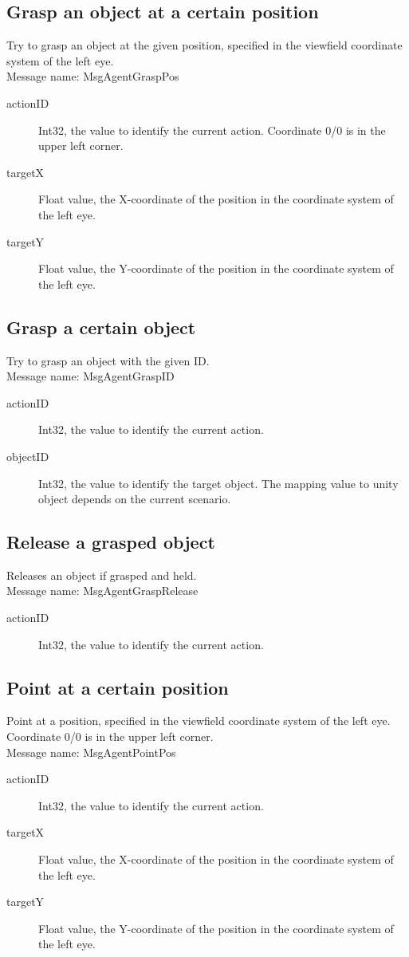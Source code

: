 \documentclass[a4paper,10pt]{scrartcl}
\begin{document}
\subsection{Grasp an object at a certain position}
Try to grasp an object at the given position, specified in the viewfield coordinate system of the left eye.\\
Message name: MsgAgentGraspPos 
\begin{description}
 \item [actionID] Int32, the value to identify the current action. Coordinate 0/0 is in the upper left corner.
 \item [targetX] Float value, the X-coordinate of the position in the coordinate system of the left eye.
 \item [targetY] Float value, the Y-coordinate of the position in the coordinate system of the left eye.
\end{description}

\subsection{Grasp a certain object}
Try to grasp an object with the given ID.\\
Message name: MsgAgentGraspID
\begin{description}
 \item [actionID] Int32, the value to identify the current action.
 \item [objectID] Int32, the value to identify the target object. The mapping value to unity object depends on the current scenario.
\end{description}

\subsection{Release a grasped object}
Releases an object if grasped and held.\\
Message name: MsgAgentGraspRelease
\begin{description}
 \item [actionID] Int32, the value to identify the current action.
\end{description}

\subsection{Point at a certain position}
Point at a position, specified in the viewfield coordinate system of the left eye. Coordinate 0/0 is in the upper left corner.\\
Message name: MsgAgentPointPos 
\begin{description}
 \item [actionID] Int32, the value to identify the current action.
 \item [targetX] Float value, the X-coordinate of the position in the coordinate system of the left eye.
 \item [targetY] Float value, the Y-coordinate of the position in the coordinate system of the left eye.
\end{description}
\end{document}
